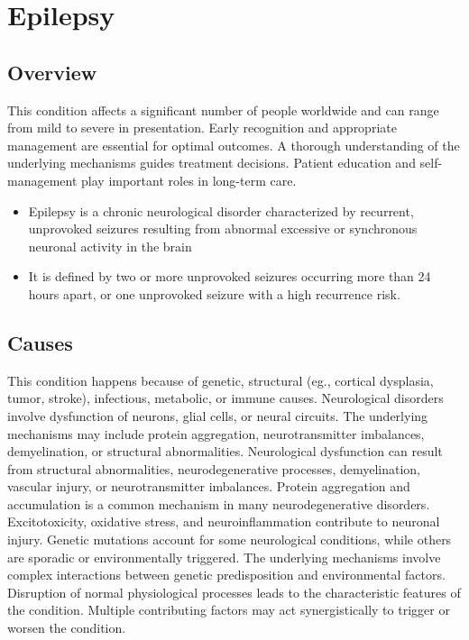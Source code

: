 \chapter{Epilepsy}
\label{sec:Epilepsy}

\section{Overview}
This condition affects a significant number of people worldwide and can range from mild to severe in presentation. Early recognition and appropriate management are essential for optimal outcomes. A thorough understanding of the underlying mechanisms guides treatment decisions. Patient education and self-management play important roles in long-term care.

\begin{itemize}[noitemsep]
  \item Epilepsy is a chronic neurological disorder characterized by recurrent, unprovoked seizures resulting from abnormal excessive or synchronous neuronal activity in the brain
  \item It is defined by two or more unprovoked seizures occurring more than 24 hours apart, or one unprovoked seizure with a high recurrence risk.
\end{itemize}
\section{Causes}
This condition happens because of genetic, structural (eg., cortical dysplasia, tumor, stroke), infectious, metabolic, or immune causes. Neurological disorders involve dysfunction of neurons, glial cells, or neural circuits. The underlying mechanisms may include protein aggregation, neurotransmitter imbalances, demyelination, or structural abnormalities. Neurological dysfunction can result from structural abnormalities, neurodegenerative processes, demyelination, vascular injury, or neurotransmitter imbalances. Protein aggregation and accumulation is a common mechanism in many neurodegenerative disorders. Excitotoxicity, oxidative stress, and neuroinflammation contribute to neuronal injury. Genetic mutations account for some neurological conditions, while others are sporadic or environmentally triggered. The underlying mechanisms involve complex interactions between genetic predisposition and environmental factors. Disruption of normal physiological processes leads to the characteristic features of the condition. Multiple contributing factors may act synergistically to trigger or worsen the condition.
